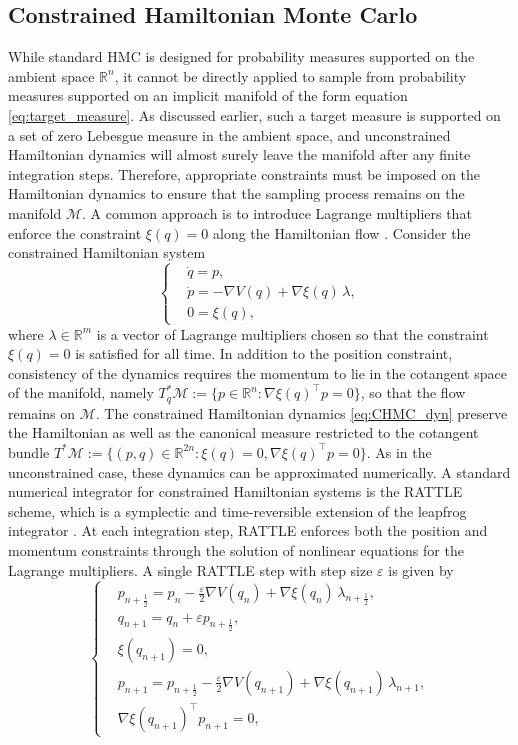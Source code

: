\documentclass[12pt]{article}
\begin{document}
\subsection{Constrained Hamiltonian Monte Carlo}\label{sec3.2}

While standard HMC is designed for probability measures supported on the ambient space $\mathbb{R}^n$, it cannot be directly applied to sample from probability measures supported on an implicit manifold of the form equation \eqref{eq:target_measure}. As discussed earlier, such a target measure is supported on a set of zero Lebesgue measure in the ambient space, and unconstrained Hamiltonian dynamics will almost surely leave the manifold after any finite integration steps. 
Therefore, appropriate constraints must be imposed on the Hamiltonian dynamics to ensure that the sampling process remains on the manifold $\mathcal{M}$. A common approach is to introduce Lagrange multipliers that enforce the constraint $\xi(q)=0$ along the Hamiltonian flow \citep{M4}. Consider the constrained Hamiltonian system
\begin{equation}\label{eq:CHMC_dyn}
\begin{cases}
&\dot{q} = p, \\
&\dot{p} = -\nabla V(q) + \nabla \xi(q)\,\lambda, \\
& 0 = \xi(q),
\end{cases}
\end{equation}
where $\lambda \in \mathbb{R}^m$ is a vector of Lagrange multipliers chosen so that the constraint $\xi(q)=0$ is satisfied for all time. 
In addition to the position constraint, consistency of the dynamics requires the momentum to lie in the cotangent space of the manifold, namely $T^*_q\mathcal{M} := \{p\in\mathbb{R}^n: \nabla \xi(q)^\top p = 0\}$,
so that the flow remains on $\mathcal{M}$.
The constrained Hamiltonian dynamics \eqref{eq:CHMC_dyn} preserve the Hamiltonian
as well as the canonical measure restricted to the cotangent bundle $T^*\mathcal{M}:=\{(p,q)\in\mathbb{R}^{2n}: \xi(q)=0, \nabla \xi(q)^\top p = 0 \}$. 
As in the unconstrained case, these dynamics can be approximated numerically.
A standard numerical integrator for constrained Hamiltonian systems is the RATTLE scheme, which is a symplectic and time-reversible extension of the leapfrog integrator \citep{J11}. 
At each integration step, RATTLE enforces both the position and momentum constraints through the solution of nonlinear equations for the Lagrange multipliers.
A single RATTLE step with step size $\varepsilon$ is given by
\begin{equation}\label{eq:RATTLE}
\begin{cases}
&p_{n+\frac12} = p_n - \frac{\varepsilon}{2}\nabla V(q_n) + \nabla \xi(q_n)\,\lambda_{n+\frac12}, \\
&q_{n+1} = q_n + \varepsilon p_{n+\frac12}, \\ &\xi(q_{n+1}) = 0, \\
&p_{n+1} = p_{n+\frac12} - \frac{\varepsilon}{2}\nabla V(q_{n+1}) + \nabla \xi(q_{n+1})\,\lambda_{n+1}, \\
&\nabla \xi(q_{n+1})^\top p_{n+1} = 0,
\end{cases}
\end{equation}
\end{document}
